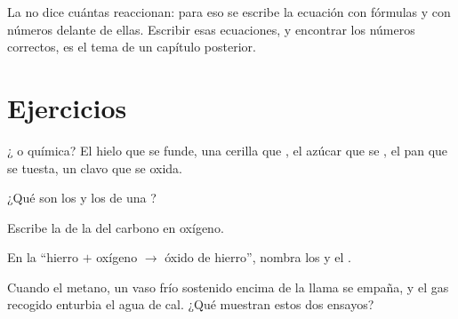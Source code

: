 \begin{remark}\label{rem:g7:chemical-reactions:counting}
La  no dice cuántas  reaccionan: para eso
se escribe la ecuación con fórmulas y con números delante de ellas.
Escribir esas ecuaciones, y encontrar los números correctos, es el tema
de un capítulo posterior.
\end{remark}

\section{Ejercicios}

\begin{exercise}[$\star$]\label{exo:g7:chemical-reactions:1}
¿ o química? El hielo que se funde, una cerilla que
, el azúcar que se , el pan que se tuesta, un clavo que se
oxida.
\end{exercise}

\begin{exercise}[$\star$]\label{exo:g7:chemical-reactions:2}
¿Qué son los  y los  de una ?
\end{exercise}

\begin{exercise}[$\star$]\label{exo:g7:chemical-reactions:3}
Escribe la  de la  del carbono en
oxígeno.
\end{exercise}

\begin{exercise}[$\star$]\label{exo:g7:chemical-reactions:4}
En la  ``hierro $+$ oxígeno $\longrightarrow$
óxido de hierro'', nombra los  y el .
\end{exercise}

\begin{exercise}[$\star\star$]\label{exo:g7:chemical-reactions:5}
Cuando  el metano, un vaso frío sostenido encima de la llama se
empaña, y el gas recogido enturbia el agua de cal. ¿Qué 
muestran estos dos ensayos?
\end{exercise}

